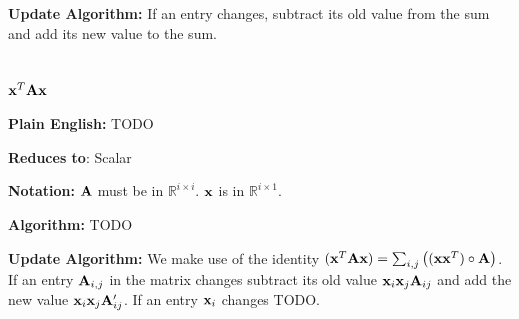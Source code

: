 \textbf{Update Algorithm:} If an entry changes, subtract its old value from the sum and add its new value to the sum.



\section{$\mathbf{x}^T \mathbf{A} \mathbf{x}$}

\textbf{Plain English:} TODO

\textbf{Reduces to}: Scalar

\textbf{Notation:} $\mathbf{A}$ must be in $\mathbb{R}^{i\times i}$. $\mathbf{x}$ is in $\mathbb{R}^{i \times 1}$.

\textbf{Algorithm:} TODO

\textbf{Update Algorithm:} We make use of the identity $(\mathbf{x}^T \mathbf{A} \mathbf{x})=\sum_{i,j}\big((\mathbf{x} \mathbf{x}^T)\circ\mathbf{A}\big)$. If an entry $\mathbf{A}_{i,j}$ in the matrix changes subtract its old value $\mathbf{x}_i \mathbf{x}_j \mathbf{A}_{ij}$ and add the new value $\mathbf{x}_i \mathbf{x}_j \mathbf{A}_{ij}'$. If an entry $\mathbf{x}_i$ changes TODO.
